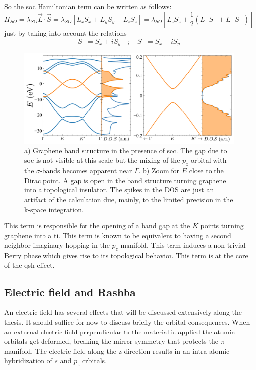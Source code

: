 So the \ac{soc} Hamiltonian term can be written as follows:
\begin{equation}
   H_{SO}= \lambda_{SO}\vec{L}\cdot\vec{S} =
   \lambda_{SO}\left[L_xS_x + L_yS_y + L_zS_z \right] =
   \lambda_{SO}\left[L_zS_z+
   \frac{1}{2}\left(L^{+}S^{-}+L^{-}S^{+}\right)\right]
\label{soc}
\end{equation}
just by taking into account the relations
\begin{equation*}
   S^{+} = S_x + iS_y \quad;\quad
   S^{-} = S_x - iS_y
\end{equation*}

\begin{figure}[!ht]
\centering
\includegraphics{graphene/figures/banddos_SOC.pdf}
\vspace{-5pt}
\caption{a) Graphene band structure in the presence of \ac{soc}. The gap due to \ac{soc} is not visible at this scale but the mixing of the $p_z$ orbital with the $\sigma$-bands becomes apparent near $\Gamma$. b) Zoom for $E$ close to the Dirac point. A gap is open in the band structure turning graphene into a topological insulator. The spikes in the DOS are just an artifact of the calculation due, mainly, to the limited precision in the k-space integration.}
\label{fig:SOC}
\end{figure}
\FloatBarrier

This term is responsible for the opening of a band gap at the $K$ points turning graphene into a \ac{ti}. %
This term is known to be equivalent to having a second neighbor imaginary hopping in the $p_z$ manifold\cite{Haldane1988,Kane2005,Kane2005a}. This term induces a non-trivial Berry phase which gives rise to its topological behavior.
This term is at the core of the \ac{qsh} effect. %


\subsection{Electric field and Rashba}  %
An electric field has several effects that will be discussed extensively along the thesis. It should suffice for now to discuss briefly the orbital consequences.
When an external electric field perpendicular to the material is applied the atomic orbitals get deformed, breaking the mirror symmetry that protects the $\pi$-manifold. %
The electric field along the z direction results in an intra-atomic hybridization of $s$ and $p_z$ orbitals. 

